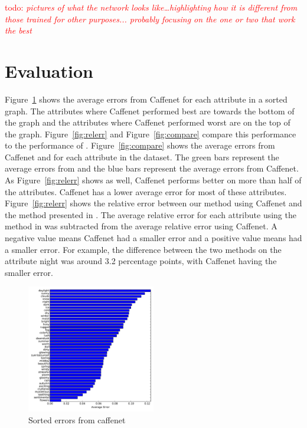 \documentclass{article}
\newcommand{\todo}[1]{\textcolor{red}{todo: {\em #1}}}
\newcommand{\figref}[1]{Figure~\ref{fig:#1}}
\begin{document}
\todo{pictures of what the network looks like\dots highlighting how it
is different from those trained for other purposes... probably
focusing on the one or two that work the best}

\section{Evaluation}
\indent
\figref{sort} shows the average errors from Caffenet for each attribute
in a sorted graph.  The attributes where Caffenet performed best are towards
the bottom of the graph and the attributes where Caffenet performed
worst are on the top of the graph. \figref{relerr} and \figref{compare} 
compare this performance to the performance of \cite{Laffont14}.
\newline\indent
\figref{compare} shows the average errors from Caffenet and \cite{Laffont14}
for each attribute in the dataset.  The green bars represent the average errors
from \cite{Laffont14} and the blue bars represent the average errors from Caffenet.
As \figref{relerr} shows as well, Caffenet performs better on more than half of 
the attributes.  Caffenet has a lower average error for most of these attributes.
\newline\indent
\figref{relerr} shows the relative error between our method using Caffenet
and the method presented in \cite{Laffont14}.  The average relative error 
for each attribute using the method in \cite{Laffont14} was subtracted from
the average relative error using Caffenet.  A negative value means Caffenet
had a smaller error and a positive value means \cite{Laffont14} had a smaller
error.  For example, the difference between the two methods on the attribute
night was around 3.2 percentage points, with Caffenet having the smaller 
error.

 
 
%
%
%


\begin{figure}[t]
	\centering
		\includegraphics[width=0.5\textwidth]{figs/sorted_err.pdf}
		\caption{Sorted errors from caffenet}\label{fig:sort}
\end{figure}
\end{document}
